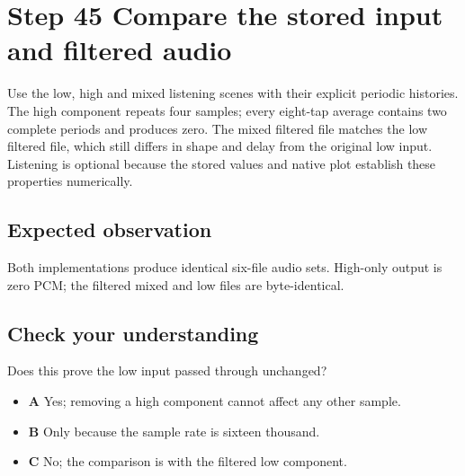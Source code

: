 \section{Step 45 Compare the stored input and filtered audio}\label{fir-s45}

Use the low, high and mixed listening scenes with their explicit periodic histories. The high component repeats four samples; every eight-tap average contains two complete periods and produces zero. The mixed filtered file matches the low filtered file, which still differs in shape and delay from the original low input. Listening is optional because the stored values and native plot establish these properties numerically.

\subsection{Expected observation}
Both implementations produce identical six-file audio sets. High-only output is zero PCM; the filtered mixed and low files are byte-identical.

\subsection{Check your understanding}
Does this prove the low input passed through unchanged?

\begin{itemize}
  \item \textbf{A} Yes; removing a high component cannot affect any other sample.
  \item \textbf{B} Only because the sample rate is sixteen thousand.
  \item \textbf{C} No; the comparison is with the filtered low component.
\end{itemize}
